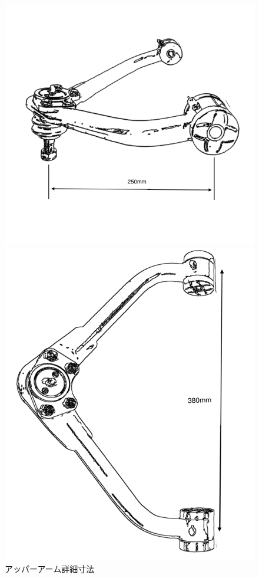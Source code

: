 \documentclass[dvipdfmx]{jsarticle}
\begin{document}
\begin{figure}
\centering
\begin{minipage}{.5\textwidth}
  \centering
  \includegraphics[scale=.3]{arm-detail-1.png}
\end{minipage}%
\begin{minipage}{.5\textwidth}
  \centering
  \includegraphics[scale=.2]{arm-detail-2.png}
\end{minipage}
\caption{アッパーアーム詳細寸法}
\label{fig:arm-detail}
\end{figure}
\end{document}
